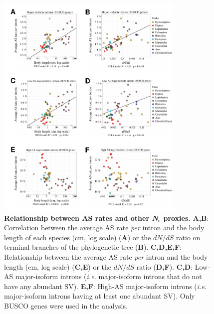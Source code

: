 \begin{figure}[t]   
    \begin{center}                                                                       
        \includegraphics[width=0.8\textwidth] {Figure3_supp.pdf}
    \end{center}                                                                       
    \caption[Relationship between AS rates and other \textit{N}$_{\text{e}}$ proxies]{\textbf{Relationship between AS rates and other \textit{N}$_{\text{e}}$ proxies.} \textbf{A,B}: Correlation between the average AS rate \textit{per} intron and the body length of each species (cm, log scale) (\textbf{A}) or the ${dN}/{dS}$ ratio on terminal branches of the phylogenetic tree (\textbf{B}). \textbf{C,D,E,F}: Relationship between the average AS rate \textit{per} intron and the body length (cm, log scale) (\textbf{C,E}) or the ${dN}/{dS}$ ratio (\textbf{D,F}). \textbf{C,D}: Low-AS major-isoform introns (\textit{i.e.} major-isoform introns that do not have any abundant SV). \textbf{E,F}: High-AS major-isoform introns (\textit{i.e.} major-isoform introns having at least one abundant SV). Only BUSCO genes were used in the analysis.}
    \label{supp_fig:AS3}
\end{figure}


\clearpage

